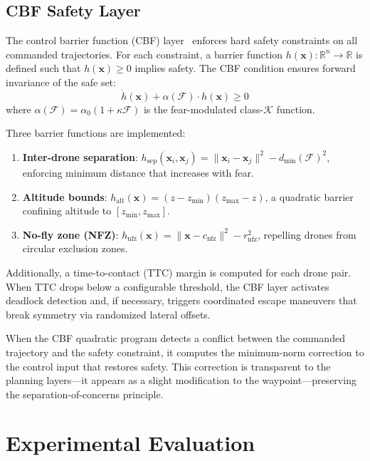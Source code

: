 \documentclass[conference]{IEEEtran}
\newcommand{\fear}{\mathcal{F}}
\newcommand{\state}{\mathbf{x}}
\newcommand{\R}{\mathbb{R}}
\begin{document}
\subsection{CBF Safety Layer}
\label{sec:cbf}

The control barrier function (CBF) layer~\cite{ames2017cbf} enforces
hard safety constraints on all commanded trajectories.  For each
constraint, a barrier function $h(\state) : \R^n \to \R$ is defined
such that $h(\state) \geq 0$ implies safety.  The CBF condition
ensures forward invariance of the safe set:
\begin{equation}
\label{eq:cbf}
  \dot{h}(\state) + \alpha(\fear) \cdot h(\state) \geq 0
\end{equation}
where $\alpha(\fear) = \alpha_0 (1 + \kappa\fear)$ is the
fear-modulated class-$\mathcal{K}$ function.

Three barrier functions are implemented:
\begin{enumerate}
\setlength{\itemsep}{0pt}
  \item \textbf{Inter-drone separation}: $h_{\text{sep}}(\state_i,
    \state_j) = \|\state_i - \state_j\|^2 - d_{\min}(\fear)^2$,
    enforcing minimum distance that increases with fear.
  \item \textbf{Altitude bounds}: $h_{\text{alt}}(\state) =
    (z - z_{\min})(z_{\max} - z)$, a quadratic barrier confining
    altitude to $[z_{\min}, z_{\max}]$.
  \item \textbf{No-fly zone (NFZ)}: $h_{\text{nfz}}(\state) =
    \|\state - c_{\text{nfz}}\|^2 - r_{\text{nfz}}^2$, repelling
    drones from circular exclusion zones.
\end{enumerate}

Additionally, a time-to-contact (TTC) margin is computed for each
drone pair.  When TTC drops below a configurable threshold, the CBF
layer activates deadlock detection and, if necessary, triggers
coordinated escape maneuvers that break symmetry via randomized
lateral offsets.

When the CBF quadratic program detects a conflict between the
commanded trajectory and the safety constraint, it computes the
minimum-norm correction to the control input that restores safety.
This correction is transparent to the planning layers---it appears as
a slight modification to the waypoint---preserving the
separation-of-concerns principle.


\section{Experimental Evaluation}
\label{sec:eval}
\end{document}
